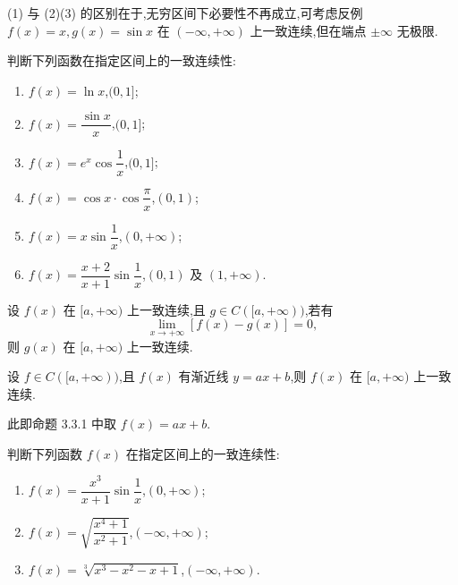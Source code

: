 \documentclass[../数学分析培优讲义.tex]{subfiles}
\begin{document}
\begin{remark}
(1) 与 (2)(3) 的区别在于,无穷区间下必要性不再成立,可考虑反例 $f(x)=x,g(x)=\sin x$ 在 $(-\infty,+\infty)$ 上一致连续,但在端点 $\pm\infty$ 无极限.
\end{remark}

\begin{example}
判断下列函数在指定区间上的一致连续性:
\begin{enumerate}[label=(\arabic*)]
    \item $f(x)=\ln x$,$(0,1\rbrack$;
    \item $f(x)=\dfrac{\sin x}{x}$,$(0,1\rbrack$;
    \item $f(x)=e^x\cos\dfrac{1}{x}$,$(0,1\rbrack$;
    \item $f(x)=\cos x\cdot\cos\dfrac{\pi}{x}$,$(0,1)$;
    \item $f(x)=x\sin\dfrac{1}{x}$,$(0,+\infty)$;
    \item $f(x)=\dfrac{x+2}{x+1}\sin\dfrac{1}{x}$,$(0,1)$ 及 $(1,+\infty)$.
\end{enumerate}
\end{example}
\exampleblank

\begin{proposition}[\markstar]
设 $f(x)$ 在 $\lbrack a,+\infty)$ 上一致连续,且 $g\in C(\lbrack a,+\infty))$,若有
\[
    \lim\limits_{x\to+\infty}[f(x)-g(x)]=0,
\]
则 $g(x)$ 在 $\lbrack a,+\infty)$ 上一致连续.
\end{proposition}

\begin{corollary}[\markstar]
设 $f\in C(\lbrack a,+\infty))$,且 $f(x)$ 有渐近线 $y=ax+b$,则 $f(x)$ 在 $\lbrack a,+\infty)$ 上一致连续.
\end{corollary}

\begin{remark}
此即命题 3.3.1 中取 $f(x)=ax+b$.
\end{remark}

\begin{example}
判断下列函数 $f(x)$ 在指定区间上的一致连续性:
\begin{enumerate}[label=(\arabic*)]
    \item $f(x)=\dfrac{x^3}{x+1}\sin\dfrac{1}{x}$,$(0,+\infty)$;
    \item $f(x)=\sqrt{\dfrac{x^4+1}{x^2+1}}$,$(-\infty,+\infty)$;
    \item $f(x)=\sqrt[3]{x^3-x^2-x+1}$,$(-\infty,+\infty)$.
\end{enumerate}
\end{example}
\exampleblank
\end{document}
